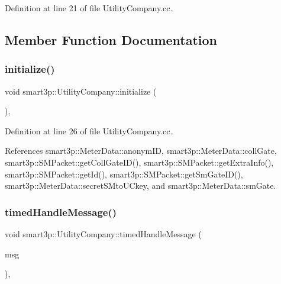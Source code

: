 Definition at line 21 of file Utility\+Company.\+cc.



\subsection{Member Function Documentation}
\mbox{\label{classsmart3p_1_1UtilityCompany_a3f7eb4fc092b71349f3ed616e35fba3e}} 
\subsubsection{\texorpdfstring{initialize()}{initialize()}}
{\footnotesize\ttfamily void smart3p\+::\+Utility\+Company\+::initialize (\begin{DoxyParamCaption}{ }\end{DoxyParamCaption})\hspace{0.3cm}{\ttfamily [protected]}, {\ttfamily [virtual]}}



Definition at line 26 of file Utility\+Company.\+cc.



References smart3p\+::\+Meter\+Data\+::anonym\+ID, smart3p\+::\+Meter\+Data\+::coll\+Gate, smart3p\+::\+S\+M\+Packet\+::get\+Coll\+Gate\+I\+D(), smart3p\+::\+S\+M\+Packet\+::get\+Extra\+Info(), smart3p\+::\+S\+M\+Packet\+::get\+Id(), smart3p\+::\+S\+M\+Packet\+::get\+Sm\+Gate\+I\+D(), smart3p\+::\+Meter\+Data\+::secret\+S\+Mto\+U\+Ckey, and smart3p\+::\+Meter\+Data\+::sm\+Gate.

\mbox{\label{classsmart3p_1_1UtilityCompany_af5ce80d9f1d293c9be21fa65668c0e74}} 
\subsubsection{\texorpdfstring{timed\+Handle\+Message()}{timedHandleMessage()}}
{\footnotesize\ttfamily void smart3p\+::\+Utility\+Company\+::timed\+Handle\+Message (\begin{DoxyParamCaption}\item[{c\+Message $\ast$}]{msg }\end{DoxyParamCaption})\hspace{0.3cm}{\ttfamily [protected]}, {\ttfamily [virtual]}}



